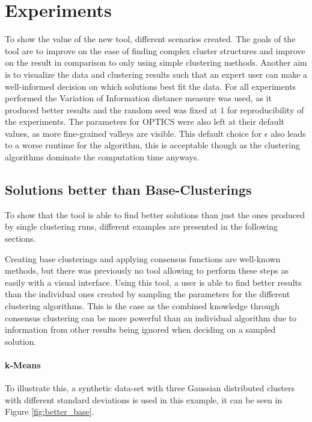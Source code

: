 \documentclass[
	a4paper,
	english,
	twoside,
	openright,               
	11pt                            
	]{report}
\begin{document}
\chapter{Experiments}\label{cha:experiments}
To show the value of the new tool, different scenarios created. The goals of the tool are to improve on the ease of finding complex cluster structures and improve on the result in comparison to only using simple clustering methods. Another aim is to visualize the data and clustering results such that an expert user can make a well-informed decision on which solutions best fit the data. For all experiments performed the Variation of Information distance measure was used, as it produced better results and the random seed was fixed at $1$ for reproducibility of the experiments. The parameters for OPTICS were also left at their default values, as more fine-grained valleys are visible. This default choice for $\epsilon$ also leads to a worse runtime for the algorithm, this is acceptable though as the clustering algorithms dominate the computation time anyways.

\section{Solutions better than Base-Clusterings}
To show that the tool is able to find better solutions than just the ones produced by single clustering runs, different examples are presented in the following sections. 

Creating base clusterings and applying consensus functions are well-known methods, but there was previously no tool allowing to perform these steps as easily with a visual interface. Using this tool, a user is able to find better results than the individual ones created by sampling the parameters for the different clustering algorithms. This is the case as the combined knowledge through consensus clustering can be more powerful than an individual algorithm due to information from other results being ignored when deciding on a sampled solution.

\subsubsection{k-Means}

To illustrate this, a synthetic data-set with three Gaussian distributed clusters with different standard deviations is used in this example, it can be seen in Figure \ref{fig:better_base}.
\end{document}
